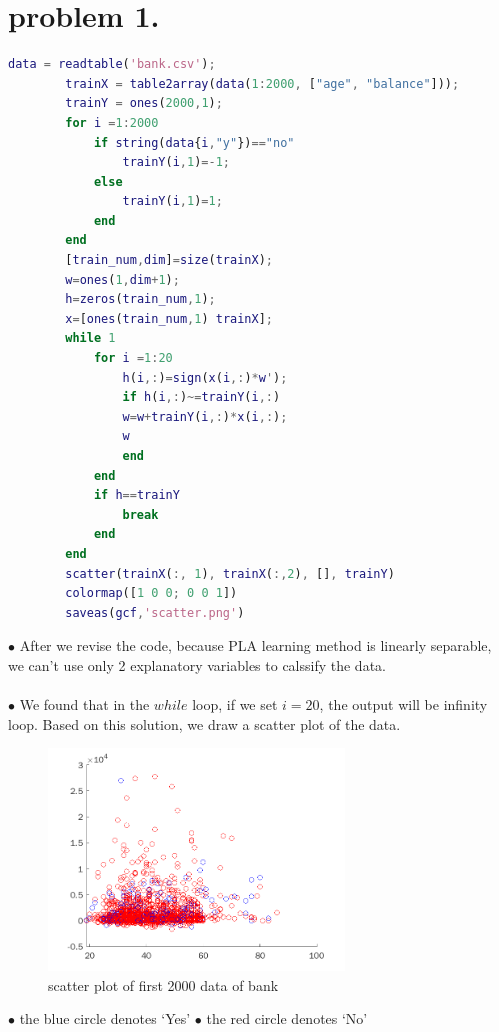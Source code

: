 \documentclass[12pt]{article}
\begin{document}
 

\rhead{\today}
 
\section*{problem 1.}
    \begin{lstlisting}[language = Matlab]
        data = readtable('bank.csv');
        trainX = table2array(data(1:2000, ["age", "balance"]));
        trainY = ones(2000,1);
        for i =1:2000
            if string(data{i,"y"})=="no"
                trainY(i,1)=-1;
            else 
                trainY(i,1)=1;
            end
        end
        [train_num,dim]=size(trainX);
        w=ones(1,dim+1);
        h=zeros(train_num,1);
        x=[ones(train_num,1) trainX];
        while 1
            for i =1:20
                h(i,:)=sign(x(i,:)*w');
                if h(i,:)~=trainY(i,:) 
                w=w+trainY(i,:)*x(i,:); 
                w
                end
            end
            if h==trainY  
                break
            end
        end
        scatter(trainX(:, 1), trainX(:,2), [], trainY)
        colormap([1 0 0; 0 0 1])
        saveas(gcf,'scatter.png')
    \end{lstlisting}
$\bullet$ After we revise the code, because PLA learning method is linearly separable, we 
can't use only 2 explanatory variables to calssify the data.\\\\
$\bullet$ We found that in the $while$ loop, if we set $i = 20$, the output will be infinity loop. Based on this solution, we draw a scatter plot of the data.

\begin{figure}[H]
    \centering
    \includegraphics[width = 0.7\textwidth]{scatter.png}
    \caption{scatter plot of first 2000 data of bank}
\end{figure}
$\bullet$ the blue circle denotes `Yes'
\newline
\hspace*{6.2mm}$\bullet$ the red circle denotes `No'

    
\end{document}

